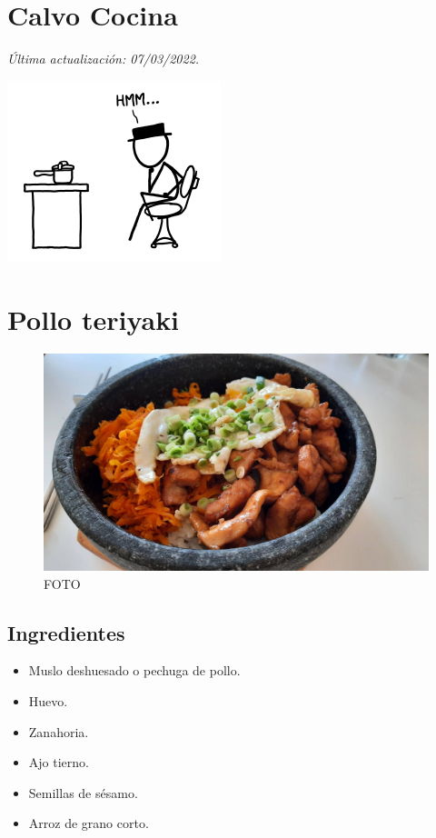 \documentclass[
]{book}
\author{}
\date{\vspace{-2.5em}2022-03-07}
\providecommand{\tightlist}{%
  \setlength{\itemsep}{0pt}\setlength{\parskip}{0pt}}
\begin{document}
{
\setcounter{tocdepth}{1}
\tableofcontents
}
\hypertarget{calvo-cocina}{%
\chapter*{Calvo Cocina}\label{calvo-cocina}}

\emph{Última actualización: 07/03/2022.}

\includegraphics{images/xkcd.png}

\hypertarget{pollo-teriyaki}{%
\chapter{Pollo teriyaki}\label{pollo-teriyaki}}

\begin{figure}
\centering
\includegraphics{images/teriyaki.jpeg}
\caption{FOTO}
\end{figure}

\hypertarget{ingredientes}{%
\section*{Ingredientes}\label{ingredientes}}

\begin{itemize}
\tightlist
\item
  Muslo deshuesado o pechuga de pollo.
\item
  Huevo.
\item
  Zanahoria.
\item
  Ajo tierno.
\item
  Semillas de sésamo.
\item
  Arroz de grano corto.
\end{itemize}
\end{document}
